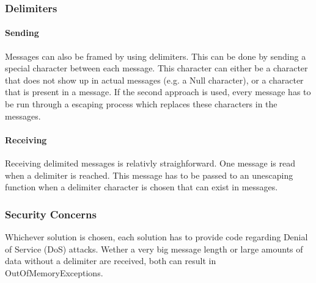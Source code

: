 \subsubsection{Delimiters}

\paragraph{Sending}

Messages can also be framed by using delimiters. This can be done by sending a special character between each message. This character can either be a character that does not show up in actual messages (e.g. a Null character), or a character that is present in a message. If the second approach is used, every message has to be run through a escaping process which replaces these characters in the messages.

\paragraph{Receiving}

Receiving delimited messages is relativly straighforward. One message is read when a delimiter is reached. This message has to be passed to an unescaping function when a delimiter character is chosen that can exist in messages.

\subsubsection{Security Concerns}

Whichever solution is chosen, each solution has to provide code regarding Denial of Service (DoS) attacks. Wether a very big message length or large amounts of data without a delimiter are received, both can result in OutOfMemoryExceptions.

